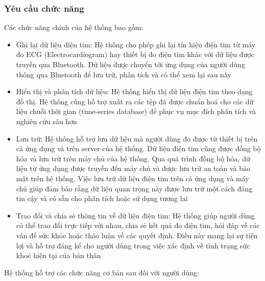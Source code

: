 \subsubsection{Yêu cầu chức năng}
Các chức năng chính của hệ thống bao gồm: 
\begin{adjustwidth}{1.5em}{}
  \begin{itemize}
      \item Ghi lại dữ liệu điện tim: Hệ thống cho phép ghi lại tín hiệu điện tim từ máy đo ECG (Electrocardiogram) hay thiết bị đo điện tim khác với dữ liệu được truyền qua Bluetooth. Dữ liệu được chuyển tới ứng dụng của người dùng thông qua Bluetooth để lưu trữ, phân tích và có thể xem lại sau này
      \item Hiển thị và phân tích dữ liệu: Hệ thống hiển thị dữ liệu điện tim theo dạng đồ thị. Hệ thống cũng hỗ trợ xuất ra các tệp đã được chuẩn hoá cho các dữ liệu chuỗi thời gian (time-series database) để phục vụ mục đích phân tích và nghiên cứu sâu hơn
      \item Lưu trữ: Hệ thống hỗ trợ lưu dữ liệu mà người dùng đo được từ thiết bị trên cả ứng dụng và trên server của hệ thống. Dữ liệu điện tim cũng được đồng bộ hóa và lưu trữ trên máy chủ của hệ thống. Qua quá trình đồng bộ hóa, dữ liệu từ ứng dụng được truyền đến máy chủ và được lưu trữ an toàn và bảo mật trên hệ thống. Việc lưu trữ dữ liệu điện tim trên cả ứng dụng và máy chủ giúp đảm bảo rằng dữ liệu quan trọng này được lưu trữ một cách đáng tin cậy và có sẵn cho phân tích hoặc sử dụng tương lai
      \item Trao đổi và chia sẻ thông tin về dữ liệu điện tim: Hệ thống giúp người dùng có thể trao đổi trực tiếp với nhau, chia sẻ kết quả đo điện tim, hỏi đáp về các vấn đề sức khỏe hoặc thảo luận về các quyết định. Điều này mang lại sự tiện lợi và hỗ trợ đáng kể cho người dùng trong việc xác định về tình trạng sức khoẻ hiện tại của bản thân
  \end{itemize}
  \end{adjustwidth}
  
Hệ thống hỗ trợ các chức năng cơ bản sau đối với người dùng:

